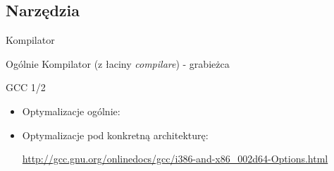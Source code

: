 \subsection{Narzędzia}
\begin{frame}[fragile]{Kompilator}
	\begin{block}{Ogólnie}
	 Kompilator (z łaciny \textit{compilare}) - grabieżca %
	\end{block}
	\begin{block}{GCC 1/2}
 		\begin{itemize}
			\item Optymalizacje ogólnie:
			\begin{itemize}
			 \item \verb*%-p[g]% //profilowanie
			 \item \verb*%-g[gdb],-Og% //debugowanie
			 \item \verb*%-O{0,1,2,3}%
			 \item \verb*%-ffast-math%
			\end{itemize}
 			\item Optymalizacje pod konkretną architekturę:
 			 \begin{itemize}
				\item \verb*%-m%
				\item \verb*%-mtune%
				\item \verb*%-march%
				\item \verb*%-mfpmath% (przykład)
			 \end{itemize}
			 \url{http://gcc.gnu.org/onlinedocs/gcc/i386-and-x86_002d64-Options.html}
		\end{itemize}
	\end{block}
\end{frame}
